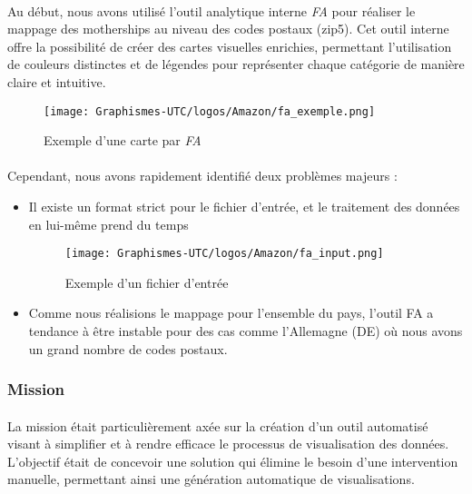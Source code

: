 \paragraph{}
\vspace{-2em}
Au début, nous avons utilisé l'outil analytique interne \textit{FA} pour réaliser le mappage des motherships au niveau des codes postaux (zip5). Cet outil interne offre la possibilité de créer des cartes visuelles enrichies, permettant l'utilisation de couleurs distinctes et de légendes pour représenter chaque catégorie de manière claire et intuitive.

\begin{figure}[H]
  \centering
  \texttt{[image: Graphismes-UTC/logos/Amazon/fa\_exemple.png]}
  \caption{Exemple d'une carte par \textit{FA}}
\end{figure}

\paragraph{}
\vspace{-2em}
Cependant, nous avons rapidement identifié deux problèmes majeurs :
\begin{itemize}
    \item Il existe un format strict pour le fichier d'entrée, et le traitement des données en lui-même prend du temps
    \begin{figure}[H]
  \centering
  \texttt{[image: Graphismes-UTC/logos/Amazon/fa\_input.png]}
  \caption{Exemple d'un fichier d'entrée}
\end{figure}

    \item Comme nous réalisions le mappage pour l'ensemble du pays, l'outil FA a tendance à être instable pour des cas comme l'Allemagne (DE) où nous avons un grand nombre de codes postaux.
\end{itemize}

\subsubsection{Mission}
\paragraph{}
\vspace{-2em}
La mission était particulièrement axée sur la création d'un outil automatisé visant à simplifier et à rendre efficace le processus de visualisation des données. L'objectif était de concevoir une solution qui élimine le besoin d'une intervention manuelle, permettant ainsi une génération automatique de visualisations. 

